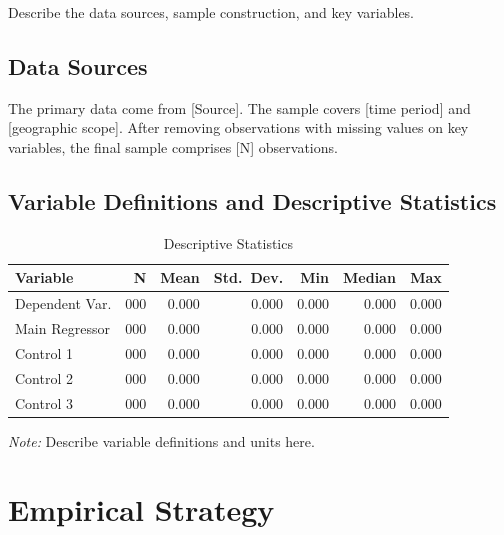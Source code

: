 \documentclass[12pt, a4paper]{article}
\theoremstyle{definition}
\theoremstyle{remark}
\begin{document}
Describe the data sources, sample construction, and key variables.

\subsection{Data Sources}

The primary data come from [Source]. The sample covers [time period] and [geographic
scope]. After removing observations with missing values on key variables, the final
sample comprises [N] observations.

\subsection{Variable Definitions and Descriptive Statistics}

\begin{table}[H]
    \centering
    \caption{Descriptive Statistics}
    \label{tab:descriptives}
    \begin{tabular}{lrrrrrr}
        \toprule
        \textbf{Variable} & \textbf{N} & \textbf{Mean} & \textbf{Std.\ Dev.}
                          & \textbf{Min}  & \textbf{Median} & \textbf{Max} \\
        \midrule
        Dependent Var.  & 000 & 0.000 & 0.000 & 0.000 & 0.000 & 0.000 \\
        Main Regressor  & 000 & 0.000 & 0.000 & 0.000 & 0.000 & 0.000 \\
        Control 1       & 000 & 0.000 & 0.000 & 0.000 & 0.000 & 0.000 \\
        Control 2       & 000 & 0.000 & 0.000 & 0.000 & 0.000 & 0.000 \\
        Control 3       & 000 & 0.000 & 0.000 & 0.000 & 0.000 & 0.000 \\
        \bottomrule
    \end{tabular}
    \begin{minipage}{\textwidth}
        \vspace{3pt}
        \footnotesize\textit{Note:} Describe variable definitions and units here.
    \end{minipage}
\end{table}

\section{Empirical Strategy}
\label{sec:empirical}
\end{document}
